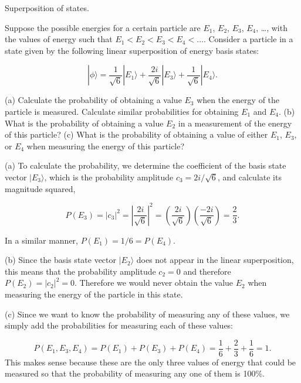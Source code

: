 \begin{example}{Superposition of states.}
\label{examp:Super}

Suppose the possible energies for a certain particle are $E_1$,
$E_2$,  $E_3$, $E_4$, \dots, with the values of energy such that $E_1 <
E_2 < E_3 < E_4 < \ldots $.  Consider a particle in a state given by
the following linear superposition of energy basis states:

\begin{equation}
|\mbox{$\phi$}\rangle = \frac{1}{\sqrt{6}} |\mbox{$E_1$}\rangle + \frac{2 i}{\sqrt{6}} |\mbox{$E_3$}\rangle + \frac{1}{\sqrt{6}} |\mbox{$E_4$}\rangle .
\end{equation}

(a) Calculate the probability of obtaining a value $E_3$ when the energy
of the particle is measured.  Calculate similar probabilities for
obtaining $E_1$ and $E_4$.  (b) What is the probability of obtaining
a value $E_2$ in a measurement of the energy of this particle?  (c)
What is the probability of obtaining a value of either $E_1$, $E_3$,
or $E_4$ when measuring the energy of this particle?

\solution
(a) To calculate the probability, we determine the coefficient of the
basis state vector $|\mbox{$E_3$}\rangle$, which is the
probability amplitude $c_3 = 2i/\sqrt{6}$, and calculate its magnitude
squared,

\begin{equation} \nonumber
P(E_3) = |c_3|^2 = \left|\frac{2 i}{\sqrt{6}}\right|^2 = \left(\frac{2 i}{\sqrt{6}}\right) \left(\frac{-2 i}{\sqrt{6}} \right) = \frac{2}{3} .
\end{equation}

\noindent In a similar manner, $P(E_1) = 1/6 = P(E_4)$.

(b) Since the basis state vector $|\mbox{$E_2$}\rangle$ does not appear in
the linear superposition, this means that the probability amplitude $c_2 =
0$ and therefore $P(E_2) = |c_2|^2 = 0$.  Therefore we would never obtain
the value $E_2$ when measuring the energy of the particle in this state.

(c) Since we want to know the probability of measuring any of these
values, we simply add the probabilities for measuring each of these
values:

\begin{equation} \nonumber
P(E_1, E_3, E_4) = P(E_1) + P(E_3) + P(E_4) = \frac{1}{6} + \frac{2}{3} + \frac{1}{6} = 1 .
\end{equation}
This makes sense because these are the only three values of energy that
could be measured so that the probability of measuring any one of them
is 100\%.

\end{example}

